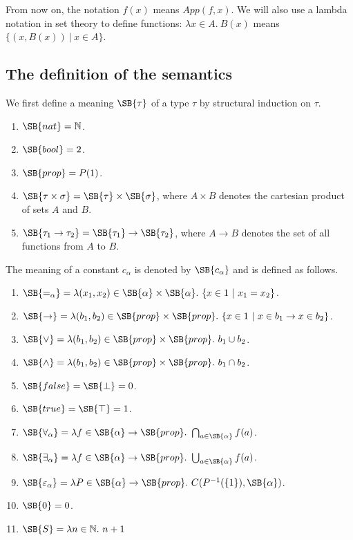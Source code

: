 \documentclass{LMCS}
\newcommand{\nat}{\ensuremath{\mathbb{N}}}
\renewcommand{\prop}{{prop}}
\newcommand{\Prop}{\ensuremath{P(1)}}
\begin{document}
From now on, the notation $f(x)$ means $App(f, x)$. We will also use a lambda
notation in set theory to define functions: $\lambda x \in A.\ B(x)$ means $\{ (x, B(x)) \ | \ x \in A \}$.

\subsection{The definition of the semantics}

We first define a meaning $\SB{\tau}$ of a type $\tau$ by structural induction on $\tau$.
\begin{enumerate}[$\bullet$]
\item $\SB{nat} = \nat$. 
\item $\SB{bool} = 2$. 
\item $\SB{prop} = \Prop$. 
\item $\SB{\tau \times \sigma} = \SB{\tau} \times \SB{\sigma}$, where $A \times
B$ denotes the cartesian product of sets $A$ and $B$. 
\item $\SB{\tau_1 \to \tau_2} = \SB{\tau_1} \to \SB{\tau_2}$, where $A \to
B$ denotes the set of all functions from $A$ to $B$. 
\end{enumerate}

The meaning of a constant $c_\alpha$ is denoted by $\SB{c_\alpha}$ and is 
defined as follows.

\begin{enumerate}[$\bullet$]
\item $\SB{=_\alpha} = \lambda (x_1, x_2) \in \SB{\alpha}\times \SB{\alpha}.\ \{ x \in 1\ | \ x_1 = x_2 \}$.
\item $\SB{\to} = \lambda (b_1, b_2) \in \SB{prop} \times \SB{prop}.\ \{ x \in 1\ | \ x \in b_1 \to x \in b_2 \}$.
\item $\SB{\lor} = \lambda (b_1, b_2) \in \SB{prop} \times \SB{prop}.\ b_1 \cup b_2$. 
\item $\SB{\land} = \lambda (b_1, b_2) \in \SB{prop} \times \SB{prop}. \ b_1 \cap b_2$. 
\item $\SB{false} = \SB{\bot} = 0$. 
\item $\SB{true} = \SB{\top} = 1$. 
\item $\SB{\forall_\alpha} = \lambda f \in \SB{\alpha} \to \SB{prop}.\ \bigcap_{a \in \SB{\alpha}} f(a)$.
\item $\SB{\exists_\alpha} = \lambda f \in \SB{\alpha} \to \SB{prop}.\ \bigcup_{a \in \SB{\alpha}} f(a)$.
\item $\SB{\varepsilon_\alpha} = \lambda P \in \SB{\alpha} \to \SB{\prop}.\
C(P^{-1}(\{1\}), \SB{\alpha})$.
\item $\SB{0} = 0$.
\item $\SB{S} = \lambda n \in \nat.\ n + 1$
\end{enumerate}
\end{document}
